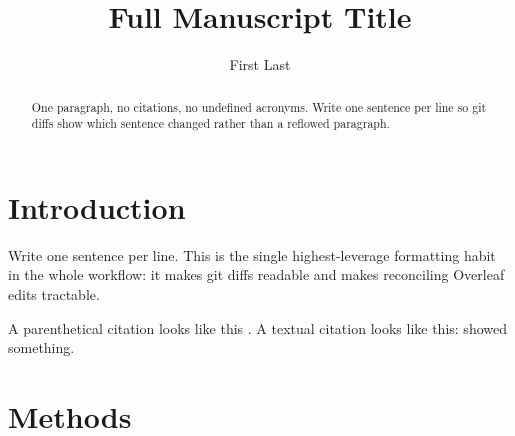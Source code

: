 \documentclass[twocolumn]{aastex702}
\begin{document}
\title{Full Manuscript Title}

\author[orcid=0000-0000-0000-0000, gname=First, sname=Last]{First Last}


\begin{abstract}
  One paragraph, no citations, no undefined acronyms.
  Write one sentence per line so git diffs show which sentence changed rather than a reflowed paragraph.
\end{abstract}


\section{Introduction}
\label{sec:intro}

Write one sentence per line.
This is the single highest-leverage formatting habit in the whole workflow: it makes git diffs readable and makes reconciling Overleaf edits tractable.

A parenthetical citation looks like this \citep{2015ApJ...805...23C}.
A textual citation looks like this: \citet{2018ApJ...868L..33L} showed something.


\section{Methods}
\label{sec:methods}
\end{document}
